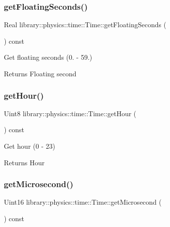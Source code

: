 \subsubsection{\texorpdfstring{get\+Floating\+Seconds()}{getFloatingSeconds()}}
{\footnotesize\ttfamily Real library\+::physics\+::time\+::\+Time\+::get\+Floating\+Seconds (\begin{DoxyParamCaption}{ }\end{DoxyParamCaption}) const}



Get floating seconds (0. -\/ 59.) 

\begin{DoxyReturn}{Returns}
Floating second 
\end{DoxyReturn}
\mbox{\label{classlibrary_1_1physics_1_1time_1_1_time_a3744d684384aabf0122dcac098e480fa}} 
\subsubsection{\texorpdfstring{get\+Hour()}{getHour()}}
{\footnotesize\ttfamily Uint8 library\+::physics\+::time\+::\+Time\+::get\+Hour (\begin{DoxyParamCaption}{ }\end{DoxyParamCaption}) const}



Get hour (0 -\/ 23) 

\begin{DoxyReturn}{Returns}
Hour 
\end{DoxyReturn}
\mbox{\label{classlibrary_1_1physics_1_1time_1_1_time_a10bc719a72442215d0f073afadc7b542}} 
\subsubsection{\texorpdfstring{get\+Microsecond()}{getMicrosecond()}}
{\footnotesize\ttfamily Uint16 library\+::physics\+::time\+::\+Time\+::get\+Microsecond (\begin{DoxyParamCaption}{ }\end{DoxyParamCaption}) const}



